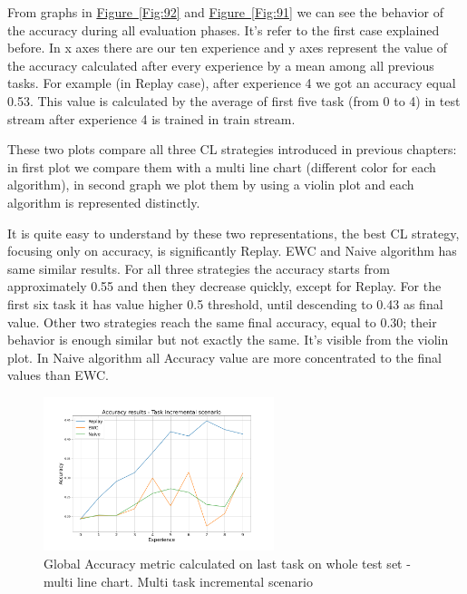 \documentclass[english, LaM, oneside]{sapthesis}%
\begin{document}
From graphs in \hyperref[Fig:92]{Figure~\ref*{Fig:92}} and \hyperref[Fig:91]{Figure~\ref*{Fig:91}} we can see the behavior of the accuracy during all evaluation phases. It's refer to the first case explained before. In x axes there are our ten experience and y axes represent the value of the accuracy calculated after every experience by a mean among all previous tasks. For example (in Replay case), after experience 4 we got an accuracy equal 0.53. This value is calculated by the average of first five task (from 0 to 4) in test stream after experience 4 is trained in train stream.

These two plots compare all three CL strategies introduced in previous chapters: in first plot we compare them with a multi line chart (different color for each algorithm), in second graph we plot them by using a violin plot and each algorithm is represented distinctly. 

It is quite easy to understand by these two representations, the best CL strategy, focusing only on accuracy, is significantly Replay. EWC and Naive algorithm has same similar results. For all three strategies the accuracy starts from approximately 0.55 and then they decrease quickly, except for Replay. For the first six task it has value higher 0.5 threshold, until descending to 0.43 as final value. Other two strategies reach the same final accuracy, equal to 0.30; their behavior is enough similar but not exactly the same. It's visible from the violin plot. In Naive algorithm all Accuracy value are more concentrated to the final values than EWC.
\begin{figure}[!h]

     \centering
     \includegraphics[width=0.60\textwidth]{overview_accuracy_nc.png}
     \caption{Global Accuracy metric calculated on last task on whole test set - multi line chart. Multi task incremental scenario}\label{Fig:93}
   
\end{figure}
\end{document}
